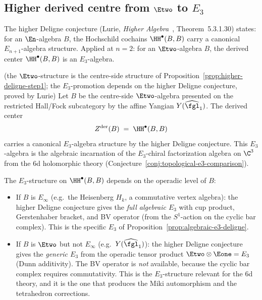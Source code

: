 \subsection{Higher derived centre from \texorpdfstring{$\Etwo$}{E2} to \texorpdfstring{$E_3$}{E3}}
\label{subsec:step2-e2-to-e3}

The higher Deligne conjecture (Lurie, \emph{Higher Algebra}~\cite{LurieHA}, Theorem~5.3.1.30) states: for an $\En$-algebra $B$, the Hochschild cochains $\HH^\bullet(B, B)$ carry a canonical $E_{n+1}$-algebra structure. Applied at $n = 2$: for an $\Etwo$-algebra $B$, the derived center $\HH^\bullet(B, B)$ is an $E_3$-algebra.

\begin{proposition}
\label{prop:higher-deligne-step2}
\textup{(the $\Etwo$-structure is the centre-side structure of Proposition~\ref{prop:higher-deligne-step1}; the $E_3$-promotion depends on the higher Deligne conjecture, proved by Lurie)}
Let \(B\) be the centre-side \(\Etwo\)-algebra presented on the
restricted Hall/Fock subcategory by the affine Yangian
\(Y(\widehat{\fgl}_1)\). The derived center
\[
 Z^{\mathrm{der}}(B) \;=\; \HH^\bullet(B, B)
\]
carries a canonical $E_3$-algebra structure by the higher Deligne conjecture. This $E_3$-algebra is the algebraic incarnation of the $E_3$-chiral factorization algebra on $\C^3$ from the $6$d holomorphic theory (Conjecture~\ref{conj:topological-e3-comparison}).
\end{proposition}

\begin{remark}
\label{rem:higher-deligne-ap153}
The $E_3$-structure on $\HH^\bullet(B, B)$ depends on the operadic level of $B$:
\begin{itemize}
 \item If $B$ is $E_\infty$ (e.g.\ the Heisenberg $H_k$, a commutative vertex algebra): the higher Deligne conjecture gives the \emph{full algebraic $E_3$} with cup product, Gerstenhaber bracket, and BV operator (from the $S^1$-action on the cyclic bar complex). This is the specific $E_3$ of Proposition~\ref{prop:algebraic-e3-deligne}.
 \item If $B$ is $\Etwo$ but not $E_\infty$ (e.g.\ $Y(\widehat{\fgl}_1)$): the higher Deligne conjecture gives the \emph{generic $E_3$} from the operadic tensor product $\Etwo \otimes \Eone = E_3$ (Dunn additivity). The BV operator is \emph{not} available, because the cyclic bar complex requires commutativity. This is the $E_3$-structure relevant for the 6d theory, and it is the one that produces the Miki automorphism and the tetrahedron corrections.
\end{itemize}
\end{remark}


